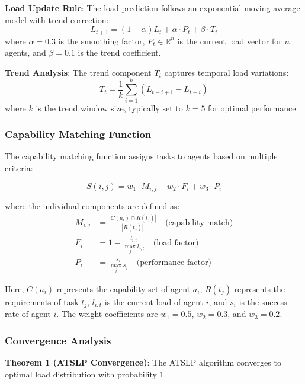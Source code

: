 \documentclass[conference]{IEEEtran}
\begin{document}
\textbf{Load Update Rule}: The load prediction follows an exponential moving average model with trend correction:
\begin{equation}
L_{t+1} = (1-\alpha)L_t + \alpha \cdot P_t + \beta \cdot T_t
\end{equation}
where $\alpha = 0.3$ is the smoothing factor, $P_t \in \mathbb{R}^n$ is the current load vector for $n$ agents, and $\beta = 0.1$ is the trend coefficient.

\textbf{Trend Analysis}: The trend component $T_t$ captures temporal load variations:
\begin{equation}
T_t = \frac{1}{k}\sum_{i=1}^{k} (L_{t-i+1} - L_{t-i})
\end{equation}
where $k$ is the trend window size, typically set to $k = 5$ for optimal performance.

\subsubsection{Capability Matching Function}

The capability matching function assigns tasks to agents based on multiple criteria:

\begin{equation}
S(i,j) = w_1 \cdot M_{i,j} + w_2 \cdot F_i + w_3 \cdot P_i
\end{equation}

where the individual components are defined as:
\begin{align}
M_{i,j} &= \frac{|C(a_i) \cap R(t_j)|}{|R(t_j)|} \quad \text{(capability match)} \\
F_i &= 1 - \frac{l_{i,t}}{\max_{j} l_{j,t}} \quad \text{(load factor)} \\
P_i &= \frac{s_i}{\max_{j} s_j} \quad \text{(performance factor)}
\end{align}

Here, $C(a_i)$ represents the capability set of agent $a_i$, $R(t_j)$ represents the requirements of task $t_j$, $l_{i,t}$ is the current load of agent $i$, and $s_i$ is the success rate of agent $i$. The weight coefficients are $w_1 = 0.5$, $w_2 = 0.3$, and $w_3 = 0.2$.

\subsubsection{Convergence Analysis}

\textbf{Theorem 1 (ATSLP Convergence)}: The ATSLP algorithm converges to optimal load distribution with probability 1.
\end{document}
